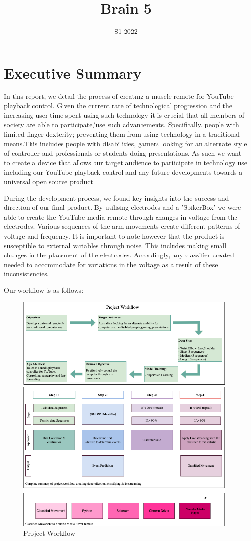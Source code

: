 \documentclass[oneside]{article}
\title{Brain 5}
\date{S1 2022}
\begin{document}


\newpage
\tableofcontents
\newpage
{}


\section{Executive Summary}
In this report, we detail the process of creating a muscle remote for YouTube playback control. Given the current rate of technological progression and the increasing user time spent using such technology it is crucial that all members of society are able to participate/use such advancements. Specifically, people with limited finger dexterity; preventing them from using technology in a traditional means.This includes people with disabilities, gamers looking for an  alternate style of controller and professionals or students doing presentations. As such we want to create a device that allows our target audience to participate in technology use including our YouTube playback control and any future developments towards a universal open source product. 

During the development process, we found key insights into the success and direction of our final product. By utilising electrodes and a 'SpikerBox’ we were able to create the YouTube media remote through changes in voltage from the electrodes. Various sequences of the arm movements create different patterns of voltage and frequency. It is important to note however that the product is susceptible to external variables through noise. This includes making small changes in the placement of the electrodes. Accordingly, any classifier created needed to accommodate for variations in the voltage as a result of these inconsistencies. 

Our workflow is as follows: 


\begin{figure}[H]
  \centering
  \includegraphics[width=11cm]{Pictures/1.png}
  \caption{Project Workflow}
  \end{figure}
\end{document}
